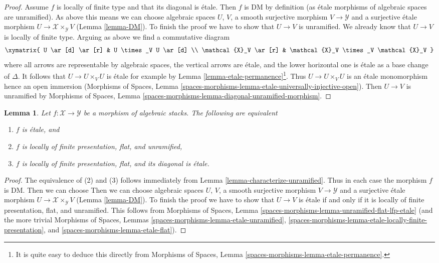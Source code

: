 \documentclass{stacks-project}
\theoremstyle{plain}
\newtheorem{lemma}[subsection]{Lemma}
\theoremstyle{definition}
\theoremstyle{remark}
\numberwithin{equation}{subsection}
\begin{document}
\begin{proof}
\medskip\noindent
Assume $f$ is locally of finite type and that its diagonal is \'etale.
Then $f$ is DM by definition (as \'etale morphisms of algebraic spaces
are unramified). As above this means we can choose
algebraic spaces $U$, $V$, a smooth surjective morphism
$V \to \mathcal{Y}$ and a surjective \'etale morphism
$U \to \mathcal{X} \times_\mathcal{Y} V$ (Lemma \ref{lemma-DM}).
To finish the proof we have to show that $U \to V$ is unramified.
We already know that $U \to V$ is locally of finite type.
Arguing as above we find a commutative diagram
$$
\xymatrix{
U \ar[d] \ar[r] & U \times_V U \ar[d] \\
\mathcal{X}_V \ar[r] & \mathcal{X}_V \times_V \mathcal{X}_V
}
$$
where all arrows are representable by algebraic spaces,
the vertical arrows are \'etale, and the lower horizontal
one is \'etale as a base change of $\Delta$.
It follows that $U \to U \times_V U$ is \'etale
for example by Lemma \ref{lemma-etale-permanence}\footnote{It is
quite easy to deduce this directly from
Morphisms of Spaces, Lemma \ref{spaces-morphisms-lemma-etale-permanence}.}.
Thus $U \to U \times_V U$ is an \'etale monomorphism
hence an open immersion (Morphisms of Spaces, Lemma
\ref{spaces-morphisms-lemma-etale-universally-injective-open}).
Then $U \to V$ is unramified by
Morphisms of Spaces, Lemma
\ref{spaces-morphisms-lemma-diagonal-unramified-morphism}.
\end{proof}

\begin{lemma}
\label{lemma-characterize-etale}
Let $f : \mathcal{X} \to \mathcal{Y}$ be a morphism of algebraic stacks.
The following are equivalent
\begin{enumerate}
\item $f$ is \'etale, and
\item $f$ is locally of finite presentation, flat, and unramified,
\item $f$ is locally of finite presentation, flat, and its diagonal
is \'etale.
\end{enumerate}
\end{lemma}

\begin{proof}
The equivalence of (2) and (3) follows immediately from
Lemma \ref{lemma-characterize-unramified}. Thus in each case
the morphism $f$ is DM. Then we can choose Then we can choose
algebraic spaces $U$, $V$, a smooth surjective morphism
$V \to \mathcal{Y}$ and a surjective \'etale morphism
$U \to \mathcal{X} \times_\mathcal{Y} V$ (Lemma \ref{lemma-DM}).
To finish the proof we have to show that
$U \to V$ is \'etale if and only if it is locally of finite
presentation, flat, and unramified.
This follows from Morphisms of Spaces, Lemma
\ref{spaces-morphisms-lemma-unramified-flat-lfp-etale}
(and the more trivial
Morphisms of Spaces, Lemmas
\ref{spaces-morphisms-lemma-etale-unramified},
\ref{spaces-morphisms-lemma-etale-locally-finite-presentation}, and
\ref{spaces-morphisms-lemma-etale-flat}).
\end{proof}
\end{document}
